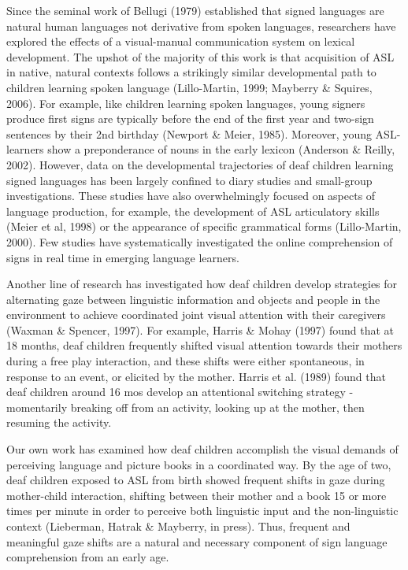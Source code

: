 \documentclass[12pt,]{article}
\begin{document}
Since the seminal work of Bellugi (1979) established that signed
languages are natural human languages not derivative from spoken
languages, researchers have explored the effects of a visual-manual
communication system on lexical development. The upshot of the majority
of this work is that acquisition of ASL in native, natural contexts
follows a strikingly similar developmental path to children learning
spoken language (Lillo-Martin, 1999; Mayberry \& Squires, 2006). For
example, like children learning spoken languages, young signers produce
first signs are typically before the end of the first year and two-sign
sentences by their 2nd birthday (Newport \& Meier, 1985). Moreover,
young ASL-learners show a preponderance of nouns in the early lexicon
(Anderson \& Reilly, 2002). However, data on the developmental
trajectories of deaf children learning signed languages has been largely
confined to diary studies and small-group investigations. These studies
have also overwhelmingly focused on aspects of language production, for
example, the development of ASL articulatory skills (Meier et al, 1998)
or the appearance of specific grammatical forms (Lillo-Martin, 2000).
Few studies have systematically investigated the online comprehension of
signs in real time in emerging language learners.

Another line of research has investigated how deaf children develop
strategies for alternating gaze between linguistic information and
objects and people in the environment to achieve coordinated joint
visual attention with their caregivers (Waxman \& Spencer, 1997). For
example, Harris \& Mohay (1997) found that at 18 months, deaf children
frequently shifted visual attention towards their mothers during a free
play interaction, and these shifts were either spontaneous, in response
to an event, or elicited by the mother. Harris et al. (1989) found that
deaf children around 16 mos develop an attentional switching strategy -
momentarily breaking off from an activity, looking up at the mother,
then resuming the activity.

Our own work has examined how deaf children accomplish the visual
demands of perceiving language and picture books in a coordinated way.
By the age of two, deaf children exposed to ASL from birth showed
frequent shifts in gaze during mother-child interaction, shifting
between their mother and a book 15 or more times per minute in order to
perceive both linguistic input and the non-linguistic context
(Lieberman, Hatrak \& Mayberry, in press). Thus, frequent and meaningful
gaze shifts are a natural and necessary component of sign language
comprehension from an early age.
\end{document}
